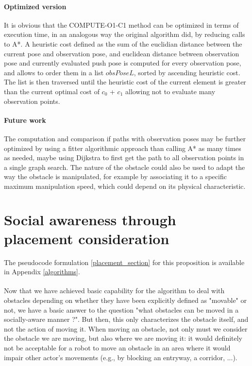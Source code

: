 \paragraph{Optimized version} It is obvious that the COMPUTE-O1-C1 method can be optimized in terms of execution time, in an analogous way the original algorithm did, by reducing calls to A*. A heuristic cost defined as the sum of the euclidian distance between the current pose and observation pose, and euclidean distance between observation pose and currently evaluated push pose is computed for every observation pose, and allows to order them in a list $obsPoseL$, sorted by ascending heuristic cost. The list is then traversed until the heuristic cost of the current element is greater than the current optimal cost of $c_{0}$ + $c_{1}$ allowing not to evaluate many observation points.

\paragraph{Future work} The computation and comparison if paths with observation poses may be further optimized by using a fitter algorithmic approach than calling A* as many times as needed, maybe using Dijkstra to first get the path to all observation points in a single graph search. The nature of the obstacle could also be used to adapt the way the obstacle is manipulated, for example by associating it to a specific maximum manipulation speed, which could depend on its physical characteristic.

\section{Social awareness through placement consideration}

\paragraph{} The pseudocode formulation \ref{placement_section} for this proposition is available in Appendix \ref{algorithms}.

\paragraph{} Now that we have achieved basic capability for the algorithm to deal with obstacles depending on whether they have been explicitly defined as "movable" or not, we have a basic answer to the question "what obstacles can be moved in a socially-aware manner ?". But then, this only characterizes the obstacle itself, and not the action of moving it. When moving an obstacle, not only must we consider the obstacle we are moving, but also where we are moving it: it would definitely not be acceptable for a robot to move an obstacle in an area where it would impair other actor's movements (e.g., by blocking an entryway, a corridor, ...).

